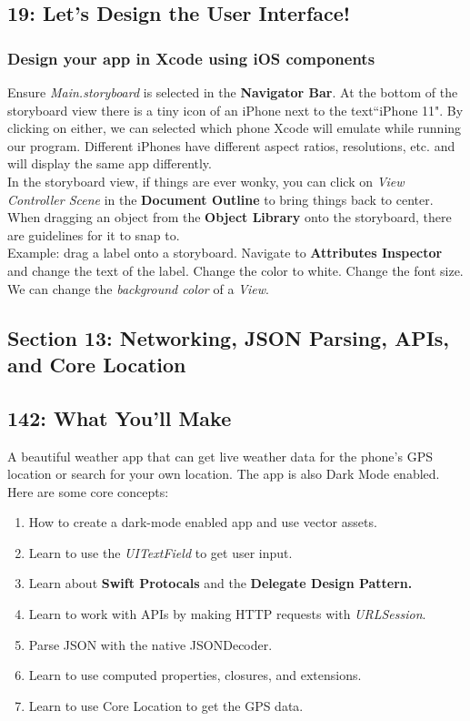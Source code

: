\documentclass[11pt, letterpaper]{article}
\begin{document}
\subsection*{19: Let's Design the User Interface!}

\subsubsection*{Design your app in Xcode using iOS components}

Ensure \emph{Main.storyboard} is selected in the \textbf{Navigator Bar}. At the bottom of the storyboard
view there is a tiny icon of an iPhone next to the text``iPhone 11". By clicking on either, we can
selected which phone Xcode will emulate while running our program. Different iPhones have different
aspect ratios, resolutions, etc. and will display the same app differently. \\

In the storyboard view, if things are ever wonky, you can click on \emph{View Controller Scene} in the
\textbf{Document Outline} to bring things back to center. When dragging an object from the
\textbf{Object Library} onto the storyboard, there are guidelines for it to snap to. \\ 

Example: drag a label onto a storyboard. Navigate to \textbf{Attributes Inspector} and change the
text of the label. Change the color to white. Change the font size. We can change the \emph{background
color} of a \emph{View}.

\subsection*{Section 13: Networking, JSON Parsing, APIs, and Core Location}

\subsection*{142: What You'll Make}

A beautiful weather app that can get live weather data for the phone's GPS location or search for your own location.
The app is also Dark Mode enabled. Here are some core concepts:

\begin{enumerate}
    \itemsep0em
    \item{How to create a dark-mode enabled app and use vector assets.}
    \item{Learn to use the \emph{UITextField} to get user input.}
    \item{Learn about \textbf{Swift Protocals} and the \textbf{Delegate Design Pattern.}}
    \item{Learn to work with APIs by making HTTP requests with \emph{URLSession}.}
    \item{Parse JSON with the native JSONDecoder.}
    \item{Learn to use computed properties, closures, and extensions.}
    \item{Learn to use Core Location to get the GPS data.}
\end{enumerate}
\end{document}
